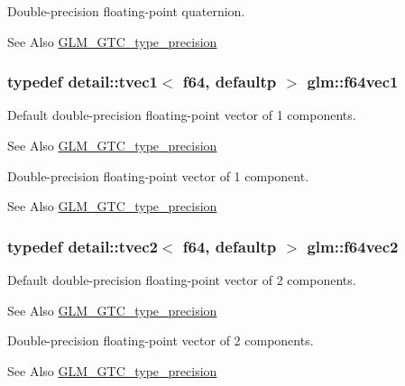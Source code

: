 Double-\/precision floating-\/point quaternion. \begin{DoxySeeAlso}{See Also}
\hyperlink{group__gtc__type__precision}{G\-L\-M\-\_\-\-G\-T\-C\-\_\-type\-\_\-precision} 
\end{DoxySeeAlso}
\hypertarget{group__gtc__type__precision_ga55bdb96a24de2e3531c74310b12ba5d7}{
\subsubsection[{f64vec1}]{\setlength{\rightskip}{0pt plus 5cm}typedef detail\-::tvec1$<$ f64, defaultp $>$ {\bf glm\-::f64vec1}}}\label{group__gtc__type__precision_ga55bdb96a24de2e3531c74310b12ba5d7}
Default double-\/precision floating-\/point vector of 1 components. \begin{DoxySeeAlso}{See Also}
\hyperlink{group__gtc__type__precision}{G\-L\-M\-\_\-\-G\-T\-C\-\_\-type\-\_\-precision}
\end{DoxySeeAlso}
Double-\/precision floating-\/point vector of 1 component. \begin{DoxySeeAlso}{See Also}
\hyperlink{group__gtc__type__precision}{G\-L\-M\-\_\-\-G\-T\-C\-\_\-type\-\_\-precision} 
\end{DoxySeeAlso}
\hypertarget{group__gtc__type__precision_ga3f131d462df8154918f93ba1ac7cc4bd}{
\subsubsection[{f64vec2}]{\setlength{\rightskip}{0pt plus 5cm}typedef detail\-::tvec2$<$ f64, defaultp $>$ {\bf glm\-::f64vec2}}}\label{group__gtc__type__precision_ga3f131d462df8154918f93ba1ac7cc4bd}
Default double-\/precision floating-\/point vector of 2 components. \begin{DoxySeeAlso}{See Also}
\hyperlink{group__gtc__type__precision}{G\-L\-M\-\_\-\-G\-T\-C\-\_\-type\-\_\-precision}
\end{DoxySeeAlso}
Double-\/precision floating-\/point vector of 2 components. \begin{DoxySeeAlso}{See Also}
\hyperlink{group__gtc__type__precision}{G\-L\-M\-\_\-\-G\-T\-C\-\_\-type\-\_\-precision} 
\end{DoxySeeAlso}
